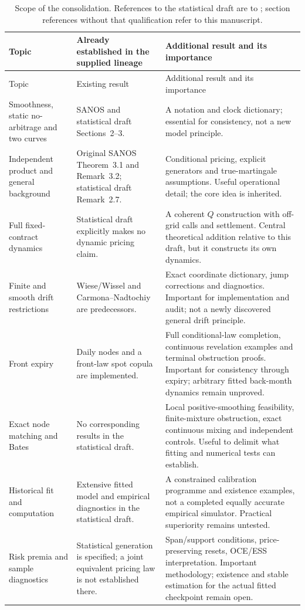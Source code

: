 \documentclass[11pt,a4paper]{article}
\numberwithin{equation}{section}
\theoremstyle{definition}\newtheorem{definition}[theorem]{Definition}
\theoremstyle{remark}\newtheorem{remark}[theorem]{Remark}
\begin{document}
\begin{longtable}{@{}p{}p{}p{}@{}}
\caption{Scope of the consolidation. References to the statistical draft are to \cite{DYSANOSv2}; section references without that qualification refer to this manuscript.}\label{tab:dy2-scope}\\
\toprule Topic & Already established in the supplied lineage & Additional result and its importance\\\midrule\endfirsthead
\toprule Topic & Existing result & Additional result and its importance\\\midrule\endhead
Smoothness, static no-arbitrage and two curves & SANOS and statistical draft Sections~2--3. & A notation and clock dictionary; essential for consistency, not a new model principle.\\[3pt]
Independent product and general background & Original SANOS Theorem~3.1 and Remark~3.2; statistical draft Remark~2.7. & Conditional pricing, explicit generators and true-martingale assumptions. Useful operational detail; the core idea is inherited.\\[3pt]
Full fixed-contract dynamics & Statistical draft explicitly makes no dynamic pricing claim. & A coherent $Q$ construction with off-grid calls and settlement. Central theoretical addition relative to this draft, but it constructs its own dynamics.\\[3pt]
Finite and smooth drift restrictions & Wiese/Wissel and Carmona--Nadtochiy are predecessors. & Exact coordinate dictionary, jump corrections and diagnostics. Important for implementation and audit; not a newly discovered general drift principle.\\[3pt]
Front expiry & Daily nodes and a front-law spot copula are implemented. & Full conditional-law completion, continuous revelation examples and terminal obstruction proofs. Important for consistency through expiry; arbitrary fitted back-month dynamics remain unproved.\\[3pt]
Exact node matching and Bates & No corresponding results in the statistical draft. & Local positive-smoothing feasibility, finite-mixture obstruction, exact continuous mixing and independent controls. Useful to delimit what fitting and numerical tests can establish.\\[3pt]
Historical fit and computation & Extensive fitted model and empirical diagnostics in the statistical draft. & A constrained calibration programme and existence examples, not a completed equally accurate empirical simulator. Practical superiority remains untested.\\[3pt]
Risk premia and sample diagnostics & Statistical generation is specified; a joint equivalent pricing law is not established there. & Span/support conditions, price-preserving resets, OCE/ESS interpretation. Important methodology; existence and stable estimation for the actual fitted checkpoint remain open.\\
\bottomrule
\end{longtable}
\end{document}
